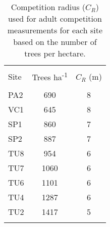
\begin{table}[!htbp] \centering 
  \caption{Competition radius ($C_R$) used for adult competition measurements for each site based on the number of trees per hectare.} 
  \label{comp_radius} 
\begin{tabular}{@{\extracolsep{5pt}} lS[table-format=3.2]S[table-format=3.2]} 
\\[-1.8ex]\hline 
\hline \\[-1.8ex] 
{Site} & {Trees ha\textsuperscript{-1}} & {$C_R$ (m)} \\
\hline \\[-1.8ex] 
PA2 & 690 & 8 \\ 
VC1 & 645 & 8 \\ 
SP1 & 860 & 7 \\ 
SP2 & 887 & 7 \\ 
TU8 & 954 & 6 \\ 
TU7 & 1060 & 6 \\ 
TU6 & 1101 & 6 \\ 
TU4 & 1287 & 6 \\ 
TU2 & 1417 & 5 \\ 
\hline \\[-1.8ex] 
\end{tabular} 
\end{table} 
